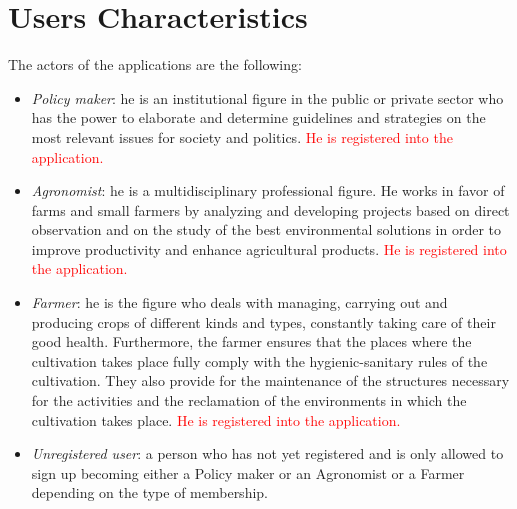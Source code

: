 \section{Users Characteristics}
The actors of the applications are the following:
\begin{itemize}
    \item \textit {Policy maker}: he is an institutional figure in the public or private sector who has the power to elaborate and determine guidelines and strategies on the most relevant issues for society and politics. \textcolor{red}{He is registered into the application.}
    \item \textit {Agronomist}: he is a multidisciplinary professional figure. He works in favor of farms and small farmers by analyzing and developing projects based on direct observation and on the study of the best environmental solutions in order to improve productivity and enhance agricultural products. \textcolor{red}{He is registered into the application.}
    \item \textit {Farmer}: he is the figure who deals with managing, carrying out and producing crops of different kinds and types, constantly taking care of their good health. Furthermore, the farmer ensures that the places where the cultivation takes place fully comply with the hygienic-sanitary rules of the cultivation. They also provide for the maintenance of the structures necessary for the activities and the reclamation of the environments in which the cultivation takes place. \textcolor{red}{He is registered into the application.}
    \item \textit {Unregistered user}: a person who has not yet registered and is only allowed to sign up becoming either a Policy maker or an Agronomist or a Farmer depending on the type of membership.
\end{itemize}
